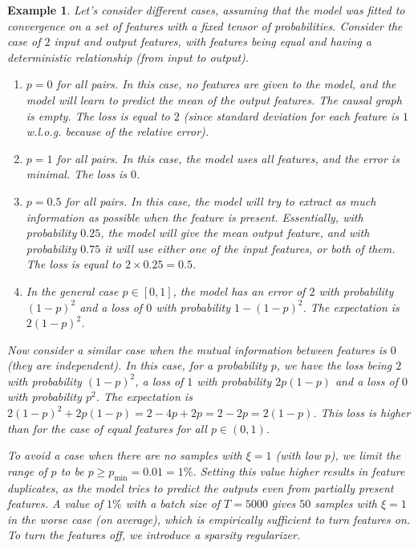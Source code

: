\documentclass[a4paper,11pt,oneside]{report}
\newtheorem{example}{Example}[section]
\begin{document}
\begin{example}
    Let's consider different cases, assuming that the model was fitted to convergence on a set of features with a fixed tensor of probabilities. Consider the case of $2$ input and output features, with features being equal and having a deterministic relationship (from input to output).
    \begin{enumerate}
        \item $p=0$ for all pairs. In this case, no features are given to the model, and the model will learn to predict the mean of the output features. The causal graph is empty. The loss is equal to $2$ (since standard deviation for each feature is $1$ w.l.o.g. because of the relative error).
        \item $p=1$ for all pairs. In this case, the model uses all features, and the error is minimal. The loss is $0$.
        \item $p=0.5$ for all pairs. In this case, the model will try to extract as much information as possible when the feature is present. Essentially, with probability $0.25$, the model will give the mean output feature, and with probability $0.75$ it will use either one of the input features, or both of them. The loss is equal to $2\times 0.25=0.5$.
        \item In the general case $p\in [0, 1]$, the model has an error of $2$ with probability $(1-p)^2$ and a loss of $0$ with probability $1-(1-p)^2$. The expectation is $2(1-p)^2$.
    \end{enumerate}

    Now consider a similar case when the mutual information between features is $0$ (they are independent). In this case, for a probability $p$, we have the loss being $2$ with probability $(1-p)^2$, a loss of $1$ with probability $2p(1-p)$ and a loss of $0$ with probability $p^2$. The expectation is $2(1-p)^2+2p(1-p)=2-4p+2p=2-2p=2(1-p)$. This loss is higher than for the case of equal features for all $p\in (0,1)$.

    To avoid a case when there are no samples with $\xi=1$ (with low $p$), we limit the range of $p$ to be $p\geq p_{\min}=0.01=1\%$. Setting this value higher results in feature duplicates, as the model tries to predict the outputs even from partially present features. A value of $1\%$ with a batch size of $T=5000$ gives $50$ samples with $\xi=1$ in the worse case (on average), which is empirically sufficient to turn features on. To turn the features off, we introduce a sparsity regularizer.
\end{example}
\end{document}
